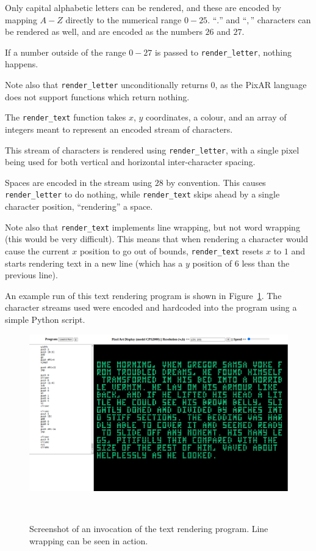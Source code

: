 \documentclass[11pt,a4paper]{scrartcl}
\begin{document}
Only capital alphabetic letters can be rendered, and these are encoded by mapping $A-Z$ directly to the numerical range $0-25$. ``$.$'' and ``$,$'' characters can be rendered as well, and are encoded as the numbers $26$ and $27$.

If a number outside of the range $0-27$ is passed to \verb|render_letter|, nothing happens.

Note also that \verb|render_letter| unconditionally returns $0$, as the PixAR language does not support functions which return nothing.

The \verb|render_text| function takes $x$, $y$ coordinates, a colour, and an array of integers meant to represent an encoded stream of characters.

This stream of characters is rendered using \verb|render_letter|, with a single pixel being used for both vertical and horizontal inter-character spacing.

Spaces are encoded in the stream using $28$ by convention. This causes \verb|render_letter| to do nothing, while \verb|render_text| skips ahead by a single character position, ``rendering'' a space.

Note also that \verb|render_text| implements line wrapping, but not word wrapping (this would be very difficult). This means that when rendering a character would cause the current $x$ position to go out of bounds, \verb|render_text| resets $x$ to $1$ and starts rendering text in a new line (which has a $y$ position of $6$ less than the previous line).

An example run of this text rendering program is shown in Figure~\ref{fig:text-render}. The
character streams used were encoded and hardcoded into the program using a simple Python script.

\begin{figure}
  \centering
  \includegraphics[width=\textwidth]{text_render}
  \caption{Screenshot of an invocation of the text rendering program. Line wrapping can be seen in action.}~\label{fig:text-render}
\end{figure}
\end{document}

